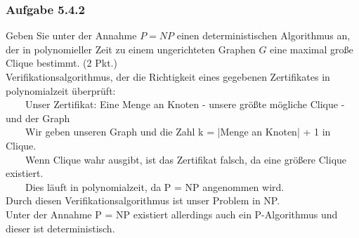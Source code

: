 \documentclass{article}
\begin{document}
\subsubsection*{Aufgabe 5.4.2}
\label{sssec:5.4.2}
Geben Sie unter der Annahme $P = NP$ einen deterministischen Algorithmus an, der in polynomieller
Zeit zu einem ungerichteten Graphen $G$ eine maximal große Clique bestimmt. (2 Pkt.)
\vspace{1cm}\-\\
Verifikationsalgorithmus, der die Richtigkeit eines gegebenen Zertifikates in polynomialzeit überprüft:\\
\-~~~~Unser Zertifikat: Eine Menge an Knoten - unsere größte mögliche Clique - und der Graph\\
\-~~~~Wir geben unseren Graph und die Zahl k = |Menge an Knoten| + 1 in Clique.\\
\-~~~~Wenn Clique wahr ausgibt, ist das Zertifikat falsch, da eine größere Clique existiert.\\
\-~~~~Dies läuft in polynomialzeit, da P = NP angenommen wird.\\
Durch diesen Verifikationsalgorithmus ist unser Problem in NP.\\
Unter der Annahme P = NP existiert allerdings auch ein P-Algorithmus und dieser ist deterministisch.
\end{document}
